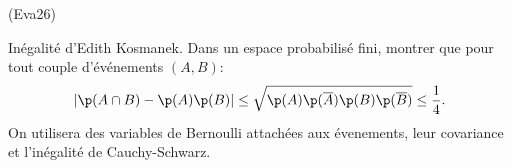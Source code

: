 \begin{tiny}(Eva26)\end{tiny} Inégalité d'Edith Kosmanek.\newline
Dans un espace probabilisé fini, montrer que pour tout couple d'événements $(A,B)$:
\[
 \left|\p(A\cap B) - \p(A)\p(B)\right| 
 \leq \sqrt{\p(A) \p(\overline{A}) \p(B) \p(\overline{B})} \leq \frac{1}{4}.
\]
On utilisera des variables de Bernoulli attachées aux évenements, leur covariance et l'inégalité de Cauchy-Schwarz.
